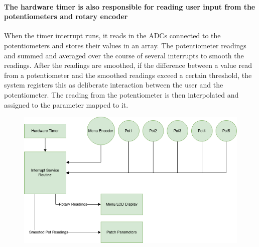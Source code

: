 \documentclass[acmlarge,screen]{acmart}
\begin{document}
	\paragraph{The hardware timer is also responsible for reading user input from the potentiometers and rotary encoder} When the timer interrupt runs, it reads in the ADCs connected to the potentiometers and stores their values in an array. The potentiometer readings and summed and averaged over the course of several interrupts to smooth the readings. After the readings are smoothed, if the difference between a value read from a potentiometer and the smoothed readings exceed a certain threshold, the system registers this as deliberate interaction between the user and the potentiometer. The reading from the potentiometer is then interpolated and assigned to the parameter mapped to it.
	
	\begin{figure}[h]
	\includegraphics[width=.8\linewidth]{timer-interrupt}
	\end{figure}
\end{document}
